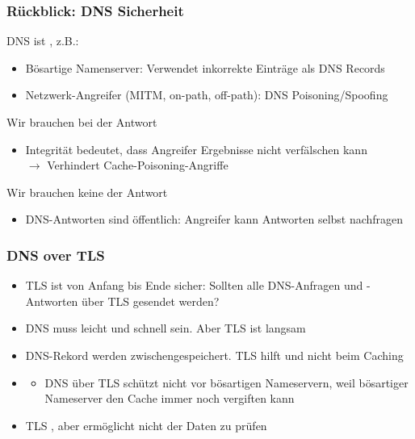 \subsubsection*{Rückblick: DNS Sicherheit}
DNS ist , z.B.:
\begin{itemize}
    \item Bösartige Namenserver: Verwendet inkorrekte Einträge als DNS Records
    \item Netzwerk-Angreifer (MITM, on-path, off-path): DNS Poisoning/Spoofing
\end{itemize}
Wir brauchen  bei der Antwort
\begin{itemize}
    \item Integrität bedeutet, dass Angreifer Ergebnisse nicht verfälschen kann\\
    $\rightarrow$ Verhindert Cache-Poisoning-Angriffe
\end{itemize}
Wir brauchen keine  der Antwort
\begin{itemize}
    \item DNS-Antworten sind öffentlich: Angreifer kann Antworten selbst nachfragen
\end{itemize}
\subsubsection*{DNS over TLS}
\begin{itemize}
    \item TLS ist von Anfang bis Ende sicher: Sollten alle DNS-Anfragen und -Antworten über TLS gesendet werden?
\end{itemize}
\begin{itemize}
    \item {} DNS muss leicht und schnell sein. Aber TLS ist langsam
    \item {} DNS-Rekord werden zwischengespeichert. TLS hilft und nicht beim Caching
    \item {}
    \begin{itemize}
        \item DNS über TLS schützt nicht vor bösartigen Nameservern, weil bösartiger Nameserver den Cache immer noch vergiften kann
    \end{itemize}
\end{itemize}
\begin{itemize}
    \item TLS , aber ermöglicht nicht  der Daten zu prüfen
\end{itemize}
